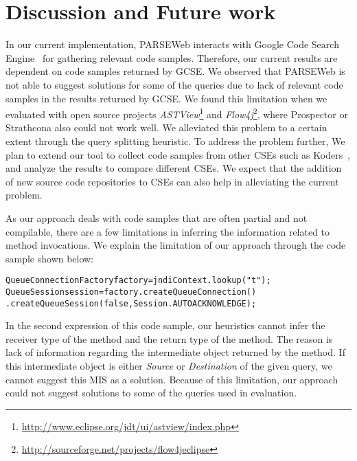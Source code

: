 \section{Discussion and Future work}
\label{sec:discussion} In our current implementation, PARSEWeb
interacts with Google Code Search Engine~\cite{GCSE} for gathering
relevant code samples. Therefore, our current results are dependent
on code samples returned by GCSE. We observed that PARSEWeb is not
able to suggest solutions for some of the queries due to lack of
relevant code samples in the results returned by GCSE. We found this
limitation when we evaluated with open source projects
\emph{ASTView}\footnote{\url{http://www.eclipse.org/jdt/ui/astview/index.php}}
and
\emph{Flow4j}\footnote{\url{http://sourceforge.net/projects/flow4jeclipse}},
where Prospector or Strathcona also could not work well. We
alleviated this problem to a certain extent through the query
splitting heuristic. To address the problem further, We plan to
extend our tool to collect code samples from other CSEs such as
Koders~\cite{KODERS}, and analyze
the results to compare different CSEs. We expect that the addition
of new source code repositories to CSEs can also help in alleviating
the current problem.

As our approach deals with code samples that are often partial and not
compilable, there are a few limitations in inferring the information
related to method invocations. We explain the limitation of our
approach through the code sample shown below:

\vspace*{-1ex}
\begin{CodeOut}
\begin{alltt}
QueueConnectionFactory factory = jndiContext.lookup("t");
QueueSession session = factory.createQueueConnection()
\hspace*{0.2in}.createQueueSession(false,Session.AUTOACKNOWLEDGE);
\end{alltt}
\end{CodeOut}
\vspace*{-1ex}

In the second expression of this code sample, our heuristics cannot
infer the receiver type of the  method
and the return type of the  method.
The reason is lack of information regarding the intermediate object
returned by the  method. If this intermediate
object is either \emph{Source} or \emph{Destination} of the given
query, we cannot suggest this MIS as a solution. 
Because of this limitation, our approach could not suggest
solutions to some of the queries used in evaluation.

